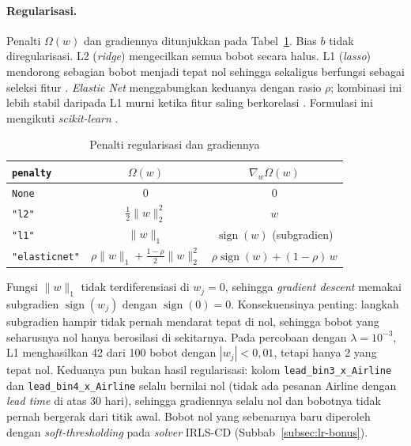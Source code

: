 \paragraph{Regularisasi.} Penalti $\Omega(w)$ dan gradiennya ditunjukkan pada Tabel~\ref{tab:lr-penalti}. Bias $b$ tidak diregularisasi. L2 (\textit{ridge}) mengecilkan semua bobot secara halus. L1 (\textit{lasso}) mendorong sebagian bobot menjadi tepat nol sehingga sekaligus berfungsi sebagai seleksi fitur \cite{tibshirani1996lasso}. \textit{Elastic Net} menggabungkan keduanya dengan rasio $\rho$; kombinasi ini lebih stabil daripada L1 murni ketika fitur saling berkorelasi \cite{zou2005elasticnet}. Formulasi ini mengikuti \textit{scikit-learn} \cite{sklearn-lr-guide}.

\begin{table}[H]
	\centering
	\caption{Penalti regularisasi dan gradiennya}
	\label{tab:lr-penalti}
	\begin{tabular}{l c c}
		\toprule
		\textbf{\texttt{penalty}} & $\Omega(w)$ & $\nabla_w \Omega(w)$ \\
		\midrule
		\texttt{None} & $0$ & $0$ \\
		\texttt{"l2"} & $\tfrac{1}{2}\lVert w\rVert_2^2$ & $w$ \\
		\texttt{"l1"} & $\lVert w\rVert_1$ & $\operatorname{sign}(w)$ (subgradien) \\
		\texttt{"elasticnet"} & $\rho\lVert w\rVert_1 + \tfrac{1-\rho}{2}\lVert w\rVert_2^2$ & $\rho\operatorname{sign}(w) + (1-\rho)\,w$ \\
		\bottomrule
	\end{tabular}
\end{table}

Fungsi $\lVert w\rVert_1$ tidak terdiferensiasi di $w_j = 0$, sehingga \textit{gradient descent} memakai subgradien $\operatorname{sign}(w_j)$ dengan $\operatorname{sign}(0) = 0$. Konsekuensinya penting: langkah subgradien hampir tidak pernah mendarat tepat di nol, sehingga bobot yang seharusnya nol hanya berosilasi di sekitarnya. Pada percobaan dengan $\lambda = 10^{-3}$, L1 menghasilkan 42 dari 100 bobot dengan $|w_j| < 0{,}01$, tetapi hanya 2 yang tepat nol. Keduanya pun bukan hasil regularisasi: kolom \texttt{lead\_bin3\_x\_Airline} dan \texttt{lead\_bin4\_x\_Airline} selalu bernilai nol (tidak ada pesanan Airline dengan \textit{lead time} di atas 30 hari), sehingga gradiennya selalu nol dan bobotnya tidak pernah bergerak dari titik awal. Bobot nol yang sebenarnya baru diperoleh dengan \textit{soft-thresholding} pada \textit{solver} IRLS-CD (Subbab~\ref{subsec:lr-bonus}).

